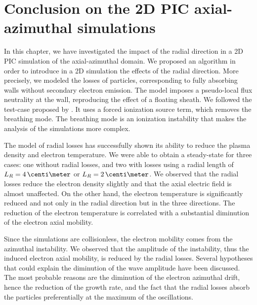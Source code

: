 


\section{Conclusion on the 2D PIC axial-azimuthal simulations}

In this chapter, we have investigated the impact of the radial direction in a \ac{2D} \ac{PIC} simulation of the axial-azimuthal domain.
We proposed an algorithm in order to introduce in a \ac{2D} \ztheta simulation the effects of the radial direction.
More precisely, we modeled the losses of particles, corresponding to fully absorbing walls without secondary electron emission.
The model imposes a pseudo-local flux neutrality at the wall, reproducing the effect of a floating sheath.
We followed the test-case proposed by \citet{boeuf2018}.
It uses a forced ionization source term, which removes the breathing mode.
The breathing mode is an ionization instability that makes the analysis of the simulations more complex.

The model of radial losses has successfully shown its ability to reduce the plasma density and electron temperature.
We were able to obtain a steady-state for three cases\string: one without radial losses, and two with losses using a radial length of $L_R=4\,\centi\meter$ or $L_R=2\,\centi\meter$.
We observed that the radial losses reduce the electron density slightly and that the axial electric field is almost unaffected.
On the other hand, the electron temperature is significantly reduced and not only in the radial direction but in the three directions.
The reduction of the electron temperature is correlated with a substantial diminution of the electron axial mobility.

Since the simulations are collisionless, the electron mobility comes from the azimuthal instability.
We observed that the amplitude of the instability, thus the induced electron axial mobility, is reduced by the radial losses.
Several hypotheses that could explain the diminution of the wave amplitude have been discussed.
The most probable reasons are the diminution of the electron azimuthal drift, hence the reduction of the growth rate, and the fact that the radial losses absorb the particles preferentially at the maximum of the oscillations.

